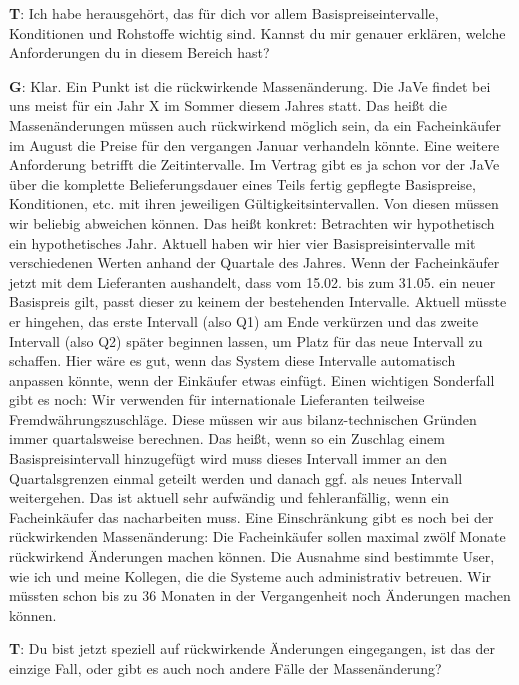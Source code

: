 \begin{list}{X:}{\setlength{\labelsep}{5mm}}
 \item[\textbf{T}:] Ich habe herausgehört, das für dich vor allem Basispreiseintervalle, Konditionen und Rohstoffe wichtig sind. Kannst du mir genauer erklären, welche Anforderungen du in diesem Bereich hast?
 \item[\textbf{G}:] Klar. Ein Punkt ist die rückwirkende Massenänderung. Die JaVe findet bei uns meist für ein Jahr X im Sommer diesem Jahres statt. Das hei\ss t die Massenänderungen müssen auch rückwirkend möglich sein, da ein Facheinkäufer \zB im August die Preise für den vergangen Januar verhandeln könnte. Eine weitere Anforderung betrifft die Zeitintervalle. Im Vertrag gibt es ja schon vor der JaVe über die komplette Belieferungsdauer eines Teils fertig gepflegte Basispreise, Konditionen, etc. mit ihren jeweiligen Gültigkeitsintervallen. Von diesen müssen wir beliebig abweichen können. Das hei\ss t konkret: Betrachten wir hypothetisch ein hypothetisches Jahr. Aktuell haben wir hier vier Basispreisintervalle mit verschiedenen Werten anhand der Quartale des Jahres. Wenn der Facheinkäufer jetzt mit dem Lieferanten aushandelt, dass vom 15.02. bis zum 31.05. ein neuer Basispreis gilt, passt dieser zu keinem der bestehenden Intervalle. Aktuell müsste er hingehen, das erste Intervall (also Q1) am Ende verkürzen und das zweite Intervall (also Q2) später beginnen lassen, um Platz für das neue Intervall zu schaffen. Hier wäre es gut, wenn das System diese Intervalle automatisch anpassen könnte, wenn der Einkäufer etwas einfügt. Einen wichtigen Sonderfall gibt es noch: Wir verwenden für internationale Lieferanten teilweise Fremdwährungszuschläge. Diese müssen wir aus bilanz-technischen Gründen immer quartalsweise berechnen. Das hei\ss t, wenn so ein Zuschlag einem Basispreisintervall hinzugefügt wird muss dieses Intervall immer an den Quartalsgrenzen einmal geteilt werden und danach ggf. als neues Intervall weitergehen. Das ist aktuell sehr aufwändig und fehleranfällig, wenn ein Facheinkäufer das nacharbeiten muss. Eine Einschränkung gibt es noch bei der rückwirkenden Massenänderung: Die Facheinkäufer sollen maximal zwölf Monate rückwirkend Änderungen machen können. Die Ausnahme sind bestimmte User, wie ich und meine Kollegen, die die Systeme auch administrativ betreuen. Wir müssten schon bis zu 36 Monaten in der Vergangenheit noch Änderungen machen können.
 \item[\textbf{T}:] Du bist jetzt speziell auf rückwirkende Änderungen eingegangen, ist das der einzige Fall, oder gibt es auch noch andere Fälle der Massenänderung?

\end{list}
